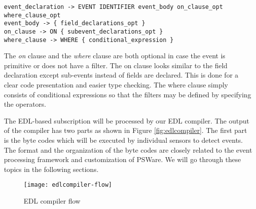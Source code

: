 \begin{lstlisting}[caption=BNF (simplified) of event type, label=lst:BNFEvent]
event_declaration -> EVENT IDENTIFIER event_body on_clause_opt where_clause_opt
event_body -> { field_declarations_opt }
on_clause -> ON { subevent_declarations_opt }
where_clause -> WHERE { conditional_expression }
\end{lstlisting}

The \emph{on} clause and the \emph{where} clause are both optional in case the event is primitive or does not have a filter. The on clause looks similar to the field declaration except sub-events instead of fields are declared. This is done for a clear code presentation and easier type checking. The where clause simply consists of conditional expressions so that the filters may be defined by specifying the operators.

\begin{comment}
A simple example of using EDL is shown in Listing \ref{lst:originaledl}. In this example, two events, 'SimpleEvent' and 'CompEvent' are defined. 'SimpleEvent' is a primitive event which occurs when the detected temperature reading is above certain threshold. 'CompEvent' is a composite event that is based on two events of 'SimpleEvent' and their time must satisfy a certain condition in order to indicate the occurrence of 'CompEvent'.
\begin{lstlisting}[caption=A simple EDL program, label=lst:originaledl]
Event SimpleEvent {
	int temp=System.temp;
	int id=System.id;
	int time=System.time;
} where {
	temp > 30
}
Event CompEvent {
} on {
	SimpleEvent e1 and
	SimpleEvent e2
} where {
	e2.time-e1.time=600
}
\end{lstlisting}
\end{comment}

The EDL-based subscription will be processed by our EDL compiler. The output of the compiler has two parts as shown in Figure \ref{fig:edlcompiler}. The first part is the byte codes which will be executed by individual sensors to detect events. The format and the organization of the byte codes are closely related to the event processing framework and customization of PSWare. We will go through these topics in the following sections.

\begin{figure}
\centering
\texttt{[image: edlcompiler-flow]}
\caption{EDL compiler flow}
\label{fig:edlcompiler-flow}
\end{figure}

